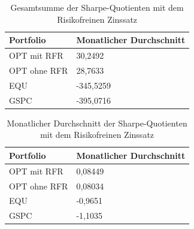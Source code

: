 \documentclass[12pt]{article}
\begin{document}
        \begin{table}[htp]
            \begin{center}
                
                \begin{tabular}{ | l | l | }

                    \hline
                    \textbf{Portfolio}   & \textbf{Monatlicher Durchschnitt} \\
                    \hline
                    OPT mit RFR          & 30,2492  \\          
                    OPT ohne RFR         & 28,7633 \\
                    EQU                  & -345,5259  \\              
                    GSPC                 & -395,0716  \\       
                            
                    \hline

                \end{tabular}
                \caption{Gesamtsumme der Sharpe-Quotienten mit dem Risikofreinen Zinssatz}
                \label{gs-sq-mit-rfz}

            \end{center}
        \end{table}

        \begin{table}[htp]
            \begin{center}
                
                \begin{tabular}{ | l | l | }

                    \hline
                    \textbf{Portfolio}   & \textbf{Monatlicher Durchschnitt} \\
                    \hline
                    OPT mit RFR          & 0,08449 \\      
                    OPT ohne RFR         & 0,08034 \\
                    EQU                  & -0,9651 \\            
                    GSPC                 & -1,1035 \\     
                            
                    \hline

                \end{tabular}
                \caption{Monatlicher Durchschnitt der Sharpe-Quotienten mit dem Risikofreinen Zinssatz}
                \label{md-sq-mit-rfz}

            \end{center}
        \end{table}
\end{document}
